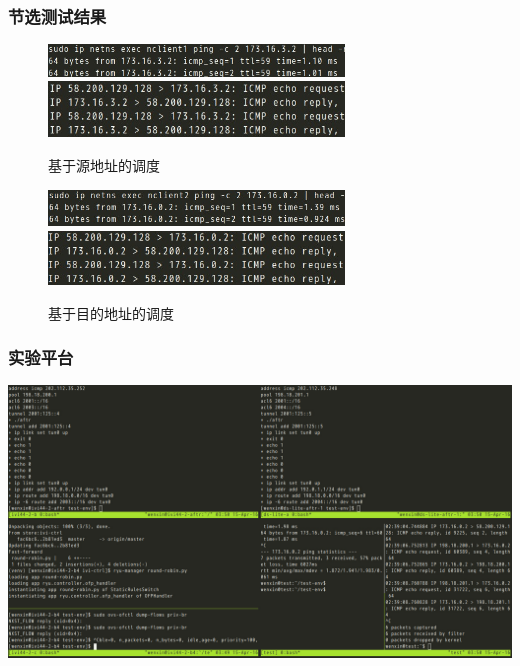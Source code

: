 \documentclass{beamer}
\begin{document}
\begin{frame}
  \frametitle{节选测试结果}

  \begin{figure}
    \includegraphics[width=0.7\textwidth]{figs/c1-s4-ping.jpeg}\\
    \includegraphics[width=0.7\textwidth]{figs/c1-s4-pdump.jpeg}
    \caption{\tiny 基于源地址的调度}
  \end{figure}

  \vspace{-1em}

  \begin{figure}
    \includegraphics[width=0.7\textwidth]{figs/c2-s1-ping.jpeg}\\
    \includegraphics[width=0.7\textwidth]{figs/c2-s1-pdump.jpeg}
    \caption{\tiny 基于目的地址的调度}
  \end{figure}
\end{frame}

\begin{frame}
  \frametitle{实验平台}

  \begin{center}
    \includegraphics[width=\textwidth]{figs/test-env.jpeg}
  \end{center}
\end{frame}
\end{document}
